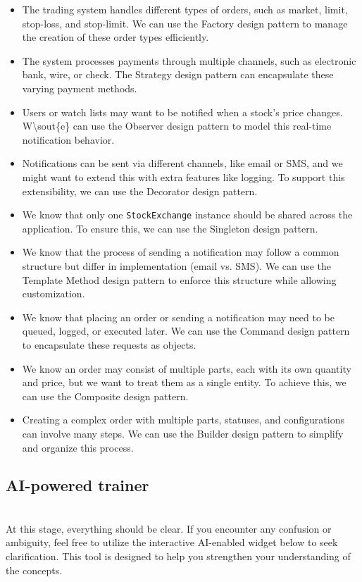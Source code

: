 \begin{itemize}
\item
The trading system handles different types of orders, such as market, limit, stop-loss, and stop-limit. We can use the Factory design pattern to manage the creation of these order types efficiently.
\item
The system processes payments through multiple channels, such as electronic bank, wire, or check. The Strategy design pattern can encapsulate these varying payment methods.
\item
Users or watch lists may want to be notified when a stock's price changes. W\textbackslash sout\{e\} can use the Observer design pattern to model this real-time notification behavior.
\item
Notifications can be sent via different channels, like email or SMS, and we might want to extend this with extra features like logging. To support this extensibility, we can use the Decorator design pattern.
\item
We know that only one \texttt{StockExchange} instance should be shared across the application. To ensure this, we can use the Singleton design pattern.
\item
We know that the process of sending a notification may follow a common structure but differ in implementation (email vs. SMS). We can use the Template Method design pattern to enforce this structure while allowing customization.
\item
We know that placing an order or sending a notification may need to be queued, logged, or executed later. We can use the Command design pattern to encapsulate these requests as objects.
\item
We know an order may consist of multiple parts, each with its own quantity and price, but we want to treat them as a single entity. To achieve this, we can use the Composite design pattern.
\item
Creating a complex order with multiple parts, statuses, and configurations can involve many steps. We can use the Builder design pattern to simplify and organize this process.
\end{itemize}

\subsection{AI-powered trainer}\label{Wzdqy9usDCKMRJ1y2PNyD}
\\
At this stage, everything should be clear. If you encounter any confusion or ambiguity, feel free to utilize the interactive AI-enabled widget below to seek clarification. This tool is designed to help you strengthen your understanding of the concepts.

